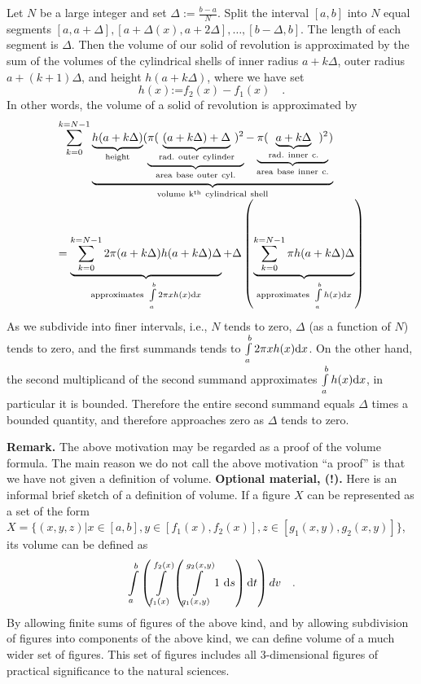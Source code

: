 \documentclass[12pt]{book}
\newcommand{\eqdef}{\textbf{:=}}
\begin{document}
Let $N$ be a large integer and set $\Delta:= \frac{b-a}{N}$. Split the interval $[a,b]$ into $N$ equal segments $[a,a+\Delta], [a+ \Delta(x), a+ 2\Delta] ,\dots, [b-\Delta, b]$. The length of each segment is $\Delta$. Then the volume of our solid of revolution is approximated by the sum of the volumes of the cylindrical shells of inner radius $a+ k\Delta $, outer radius $a+(k+1)\Delta$, and height $h(a+k\Delta)$, where we have set
\[
h(x)\eqdef f_2(x)-f_1(x)\quad .
\]
In other words, the volume of a solid of revolution is approximated by
\[
\begin{array}{l}
\displaystyle\sum_{k=0}^{k=N-1} \underbrace{ \underbrace{h(a+k\Delta)}_{\mathrm{height}}(\underbrace{\pi (\underbrace{(a+k\Delta)+\Delta}_{ \mathrm{rad.~outer~cylinder}} ) ^2}_{\mathrm{area~base~outer~cyl.}}-\underbrace{\pi (\underbrace{a+k \Delta}_{\mathrm{rad.~inner~c.}})^2}_{\mathrm{area~base~inner~c.}})}_{\mathrm{volume~k^{th}~cylindrical~shell}} \\
=\displaystyle \underbrace{\sum_{k=0}^{k=N-1} 2\pi(a+k\Delta)  h(a+k\Delta) \Delta }_{\mathrm{approximates~} \int\limits_{a}^b 2\pi x h(x) {\normalfont \text{d}} x }  + \Delta \left(\underbrace{\sum_{k=0}^{k=N-1} \pi  h(a+k\Delta)\Delta}_{\mathrm{approximates~} \int\limits_{a}^b h(x) {\normalfont \text{d}} x }\right)
\end{array}
\]
As we subdivide into finer intervals, i.e., $N$ tends to zero, $\Delta$ (as a function of $N$) tends to zero, and the first summands tends to $\int\limits_{a}^b 2\pi x h(x) {\normalfont \text{d}} x $. On the other hand, the second multiplicand of the second summand approximates $\int\limits_{a}^b h(x) {\normalfont \text{d}} x $, in particular it is bounded. Therefore the entire second summand equals $\Delta$ times a bounded quantity, and therefore approaches zero as $\Delta$ tends to zero.


\textbf{Remark.} The above motivation may be regarded as a proof of the volume formula. The main reason we do not call the above motivation ``a proof'' is that we have not given a definition of volume. \textbf{Optional material, (!).} Here is an informal brief sketch  of a definition of volume. If a figure $X$ can be represented as a set of the form $X= \{(x,y,z)| x\in [a,b], y\in [f_1(x), f_2(x)], z\in [g_1(x,y),  g_2(x,y)]\}$, its volume can be defined as
\[
\int\limits_a^b \left(\int\limits_{f_1(x)}^{f_2(x)}\left(\int\limits_{g_1(x,y)}^{g_2(x,y)} 1 ~ {\normalfont \text{d}} s \right){\normalfont \text{d}} t \right)dv \quad .
\]
By allowing finite sums of figures of the above kind, and by allowing subdivision of figures into components of the above kind, we can define volume of a much wider set of figures. This set of figures includes all 3-dimensional figures of practical significance to  the natural sciences.
\end{document}
